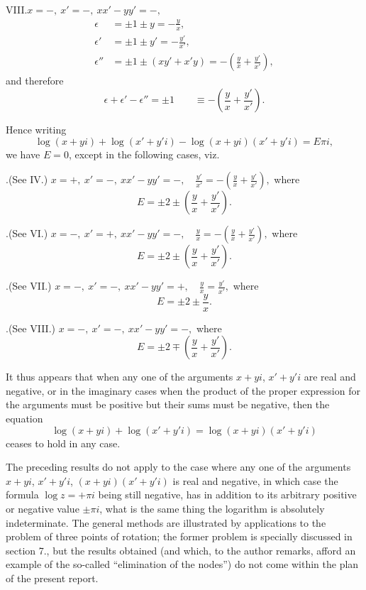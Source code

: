 \documentclass[12pt,a4paper]{article}
\theoremstyle{definition}
\begin{document}
\noindent VIII.\quad $x = -,\ x' = -,\ xx' - yy' = -,$
\begin{align*}
\epsilon &= \pm 1 \pm y = -\frac{y}{x},\\
\epsilon' &= \pm 1 \pm y' = -\frac{y'}{x'},\\
\epsilon'' &= \pm 1 \pm (xy' + x'y) = -\left(\frac{y}{x} + \frac{y'}{x'}\right),
\end{align*}
and therefore
\[
\epsilon + \epsilon' - \epsilon'' = \pm 1 \qquad \equiv -\left(\frac{y}{x} + \frac{y'}{x'}\right).
\]

\medskip

Hence writing
\[
\log(x+yi) + \log(x'+y'i) - \log(x+yi)(x'+y'i) = E\pi i,
\]
we have $E = 0$, except in the following cases, viz.

\medskip

.\quad (See IV.) \quad $x = +,\ x' = -,\ xx' - yy' = -, \quad \frac{y'}{x'} = -\left(\frac{y}{x} + \frac{y'}{x'}\right),$
\quad where
\[
E = \pm 2 \pm \left(\frac{y}{x} + \frac{y'}{x'}\right).
\]

.\quad (See VI.) \quad $x = -,\ x' = +,\ xx' - yy' = -, \quad \frac{y}{x} = -\left(\frac{y}{x} + \frac{y'}{x'}\right),$
\quad where
\[
E = \pm 2 \pm \left(\frac{y}{x} + \frac{y'}{x'}\right).
\]

.\quad (See VII.) \quad $x = -,\ x' = -,\ xx' - yy' = +, \quad \frac{y}{x} = \frac{y'}{x'},$
\quad where
\[
E = \pm 2 \pm \frac{y}{x}.
\]

.\quad (See VIII.) \quad $x = -,\ x' = -,\ xx' - yy' = -,$
\quad where
\[
E = \pm 2 \mp \left(\frac{y}{x} + \frac{y'}{x'}\right).
\]

\medskip

It thus appears that when any one of the arguments $x+yi$, $x'+y'i$ are real and negative, or
in the imaginary cases when the product of the proper expression for the
arguments must be positive but their sums must be negative, then the equation
\[
\log(x+yi) + \log(x'+y'i) = \log(x+yi)(x'+y'i)
\]
ceases to hold in any case.

\medskip

The preceding results do not apply to the case where any one of the arguments
$x+yi$, $x'+y'i$, $(x+yi)(x'+y'i)$ is real and negative, in which case the formula
$\log z = +\pi i$ being still negative, has in addition to its arbitrary positive
or negative value $\pm\pi i$, what is the same thing the logarithm is absolutely indeterminate.
The general methods are illustrated by applications to the problem of
three points of rotation; the former problem is specially discussed
in section 7., but the results obtained (and which, to the author remarks, afford an
example of the so-called ``elimination of the nodes'') do not come within the plan of
the present report.
\end{document}
